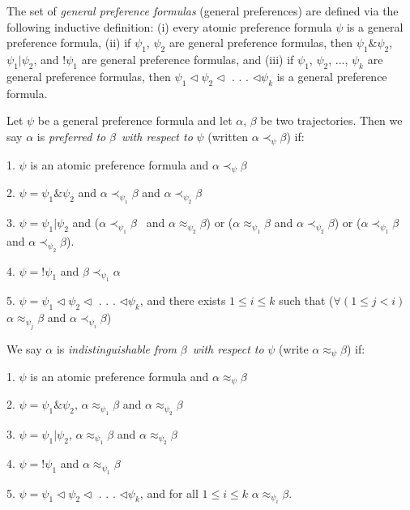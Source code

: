 \documentclass[letterpaper]{article}\usepackage{aaai}
\begin{document}
The set of \emph{general preference formulas} (general preferences) are
defined via the following inductive definition: (i) every atomic preference
formula $\psi$ is a general preference formula, (ii) if $\psi_{1}$, $\psi_{2}
$ are general preference formulas, then $\psi_{1}\&\psi_{2}$, $\psi_{1}|\psi_{2}$, and $!\psi_{1}$ are general preference formulas, and (iii) if
$\psi_{1}$, $\psi_{2}$, ..., $\psi_{k}$ are general preference formulas, then
$\psi_{1}\lhd\psi_{2}\lhd$ . . . $\lhd\psi_{k}$ is a general preference formula.

Let $\psi$ be a general preference formula and let $\alpha$, $\beta$ be two
trajectories. Then we say $\alpha$ is \emph{preferred to }$\beta$\emph{\ with
respect to }$\psi$ (written $\alpha\prec_{\psi}\beta$) if:

1. $\psi$ is an atomic preference formula and $\alpha\prec_{\psi}\beta$

2. $\psi=\psi_{1}\&\psi_{2}$ and $\alpha\prec_{\psi_{1}}\beta$ and
$\alpha\prec_{\psi_{2}}\beta$

3. $\psi=\psi_{1}|\psi_{2}$ and ($\alpha\prec_{\psi_{1}}\beta$ \ and
$\alpha\approx_{\psi_{2}}\beta$) or ($\alpha\approx_{\psi_{1}}\beta$ and
$\alpha\prec_{\psi_{2}}\beta$) or ($\alpha\prec_{\psi_{1}}\beta$ and
$\alpha\prec_{\psi_{2}}\beta$).

4. $\psi=!\psi_{1}$ and $\beta\prec_{\psi_{1}}\alpha$

5. $\psi=\psi_{1}\lhd\psi_{2}\lhd$ . . . $\lhd\psi_{k}$, and there exists
$1\leq i\leq k$ such that ($\forall\left(  1\leq j<i\right)  $ $\alpha
\approx_{\psi_{j}}\beta$ and $\alpha\prec_{\psi_{i}}\beta$) \newline

We say $\alpha$ is \emph{indistinguishable from }$\beta$\emph{\ with respect
to }$\psi$ (write $\alpha\approx_{\psi}\beta$) if:

1. $\psi$ is an atomic preference formula and $\alpha\approx_{\psi}\beta$

2. $\psi=\psi_{1}\&\psi_{2}$, $\alpha\approx_{\psi_{1}}\beta$ and
$\alpha\approx_{\psi_{2}}\beta$

3. $\psi=\psi_{1}|\psi_{2}$, $\alpha\approx_{\psi_{1}}\beta$ and
$\alpha\approx_{\psi_{2}}\beta$

4. $\psi=!\psi_{1}$ and $\alpha\approx_{\psi_{1}}\beta$

5. $\psi=\psi_{1}\lhd\psi_{2}\lhd$ . . . $\lhd\psi_{k}$, and for all $1\leq
i\leq k$ $\alpha\approx_{\psi_{i}}\beta$. \newline
\end{document}
